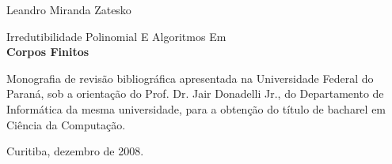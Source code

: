 \documentclass{article}
\newcommand{\veryHuge}{\fontsize{33.18}{41.12}\selectfont}
\begin{document}
\pagestyle{empty}

\begin{center}
  \Large\mdseries Leandro Miranda Zatesko
\end{center}

\vspace{25.5mm}

\hrulefill

\noindent
\begin{center}
  \LARGE Irredutibilidade Polinomial E Algoritmos Em\\
  \veryHuge\bfseries Corpos Finitos
\end{center}

\hrulefill


\hspace{.45\textwidth}
\begin{minipage}{.5\textwidth}
  Monografia de revisão bibliográfica apresentada
  na Universidade Federal do Paraná,
  sob a orientação do Prof. Dr. Jair Donadelli Jr., do Departamento de
  Informática da mesma universidade,
  para a obtenção do título de bacharel em Ciência da
  Computação.
\end{minipage}


\begin{center}
  \Large\mdseries Curitiba, dezembro de 2008.
\end{center}

\newpage
\thispagestyle{empty}
\mbox{}
\end{document}
